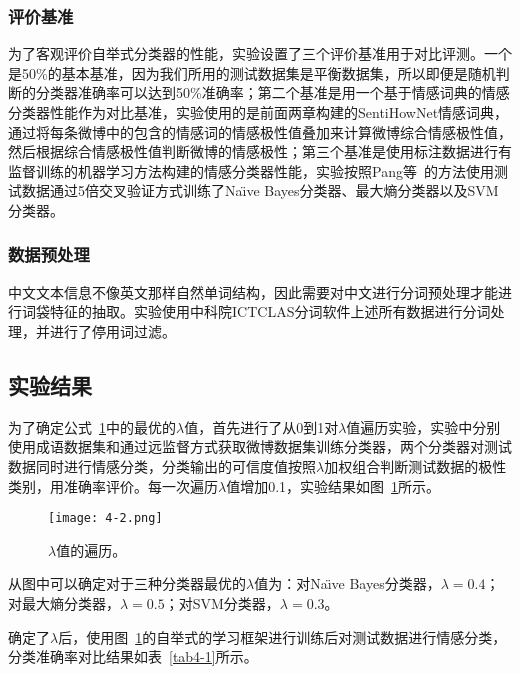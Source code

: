 \subsubsection{评价基准}
为了客观评价自举式分类器的性能，实验设置了三个评价基准用于对比评测。一个是50\%的基本基准，因为我们所用的测试数据集是平衡数据集，所以即便是随机判断的分类器准确率可以达到50\%准确率；第二个基准是用一个基于情感词典的情感分类器性能作为对比基准，实验使用的是前面两章构建的SentiHowNet情感词典，通过将每条微博中的包含的情感词的情感极性值叠加来计算微博综合情感极性值，然后根据综合情感极性值判断微博的情感极性；第三个基准是使用标注数据进行有监督训练的机器学习方法构建的情感分类器性能，实验按照Pang等~的方法使用测试数据通过5倍交叉验证方式训练了Na\"\i ve Bayes分类器、最大熵分类器以及SVM分类器。

\subsubsection{数据预处理}
中文文本信息不像英文那样自然单词结构，因此需要对中文进行分词预处理才能进行词袋特征的抽取。实验使用中科院ICTCLAS分词软件上述所有数据进行分词处理，并进行了停用词过滤。

\subsection{实验结果}
\label{result}

为了确定公式~\ref{fig4-2}中的最优的$ \lambda $值，首先进行了从0到1对$ \lambda $值遍历实验，实验中分别使用成语数据集和通过远监督方式获取微博数据集训练分类器，两个分类器对测试数据同时进行情感分类，分类输出的可信度值按照$\lambda $加权组合判断测试数据的极性类别，用准确率评价。每一次遍历$ \lambda $值增加0.1，实验结果如图~\ref{fig4-2}所示。

\begin{figure}[htp]
\centering
\texttt{[image: 4-2.png]}
\caption{$ \lambda $值的遍历。}
\label{fig4-2}
\end{figure}
从图中可以确定对于三种分类器最优的$ \lambda $值为：对Na\"\i ve Bayes分类器，$ \lambda=0.4 $；对最大熵分类器，$ \lambda=0.5 $；对SVM分类器，$ \lambda=0.3 $。

确定了$ \lambda$后，使用图~\ref{fig4-2}的自举式的学习框架进行训练后对测试数据进行情感分类，分类准确率对比结果如表~\ref{tab4-1}所示。

